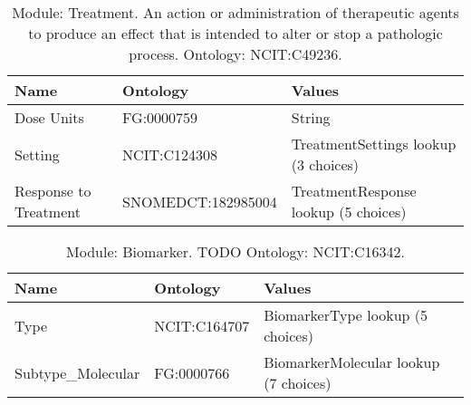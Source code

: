\documentclass{article}
\begin{document}
\begin{table}[htb]
\begin{tabular}{lll}
Name & Ontology & Values \\
\hline
Dose Units & FG:0000759 & String \\
Setting & NCIT:C124308 & TreatmentSettings lookup (3 choices) \\
Response to Treatment & SNOMEDCT:182985004 & TreatmentResponse lookup (5 choices) \\
\hline
\end{tabular}
\caption[Module: Treatment]{\label{table:table13} Module: Treatment. An action or administration of therapeutic agents to produce an effect that is intended to alter or stop a pathologic process. Ontology: NCIT:C49236. }
\end{table}

\begin{table}[htb]
\begin{tabular}{lll}
Name & Ontology & Values \\
\hline
Type & NCIT:C164707 & BiomarkerType lookup (5 choices) \\
Subtype_Molecular & FG:0000766 & BiomarkerMolecular lookup (7 choices) \\
\hline
\end{tabular}
\caption[Module: Biomarker]{\label{table:table14} Module: Biomarker. TODO Ontology: NCIT:C16342. }
\end{table}
\end{document}
